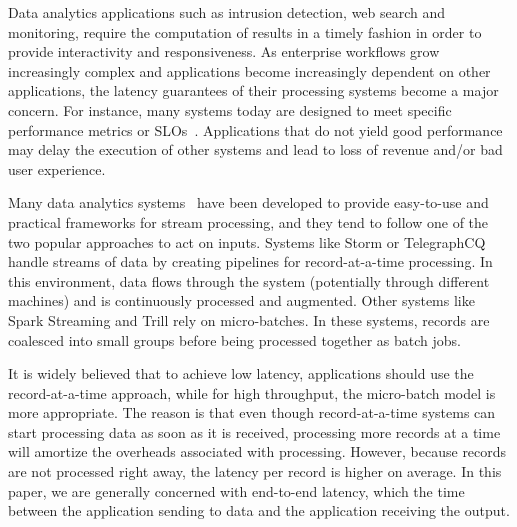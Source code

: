 Data analytics applications such as intrusion detection, web search and monitoring, require the computation of results in a timely fashion in order to provide interactivity and responsiveness. 
As enterprise workflows grow increasingly complex and applications become increasingly dependent on other applications, the latency guarantees of their processing systems become a major concern.
For instance, many systems today are designed to meet specific performance metrics or SLOs~\cite{Jockey}.
Applications that do not yield good performance may delay the execution of other systems and lead to loss of revenue and/or bad user experience.

Many data analytics 
systems~\cite{Millwheel,Babu:2001:CQO:603867.603884,TelegraphCQ,Storm,SparkStreaming,Trill,murray2013naiad,Niagara,StreamInsight,Carney:2002:MSN:1287369.1287389,Sullivan:1998:TSM:1268256.1268258,condie2010mapreduce,Brito:2011:SLD:2114498.2116192, ELF} 
have been developed to provide easy-to-use and practical frameworks for stream processing, and they tend to follow one of the two popular approaches to act on inputs.
Systems like Storm or TelegraphCQ handle streams of data by creating pipelines for record-at-a-time processing. In this environment, data flows through the system (potentially through different machines) and is continuously processed and augmented.
Other systems like Spark Streaming and Trill rely on micro-batches. In these systems, records are coalesced into small groups before being processed together as batch jobs.

It is widely believed that to achieve low latency, applications should use the record-at-a-time approach, while for high throughput, the micro-batch model is more appropriate. 
The reason is that even though record-at-a-time systems can start processing data as soon as it is received, processing more records at a time will amortize the overheads associated with processing.
However, because records are not processed right away, the latency per record is higher on average.
In this paper, we are generally concerned with end-to-end latency, which the time between the application sending to data and the application receiving the output.

